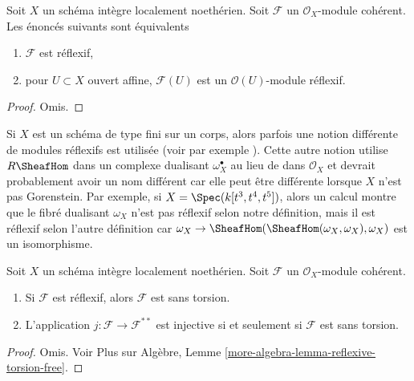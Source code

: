 \begin{lemma}
\label{lemma-check-reflexive-on-affines}
Soit  $X$  un schéma intègre localement noethérien. Soit  $\mathcal{F}$  un
 $\mathcal{O}_X$-module cohérent. Les énoncés suivants sont équivalents
\begin{enumerate}
\item $\mathcal{F}$  est réflexif,
\item pour  $U \subset X$  ouvert affine,  $\mathcal{F}(U)$  est un  $\mathcal{O}(U)$-module réflexif.
\end{enumerate}
\end{lemma}

\begin{proof}
Omis.
\end{proof}

\begin{remark}
\label{remark-different-reflexive}
Si  $X$  est un schéma de type fini sur un corps, alors parfois une notion
différente de modules réflexifs est utilisée (voir par exemple  \cite[bottom of page 5 and Definition 1.1.9]{HL}).
Cette autre notion utilise  $R\SheafHom$  dans un complexe dualisant  $\omega_X^\bullet$  au
lieu de dans  $\mathcal{O}_X$  et devrait probablement avoir un nom différent car elle
peut être différente lorsque  $X$  n'est pas Gorenstein. Par exemple, si
 $X = \Spec(k[t^3, t^4, t^5])$, alors un calcul montre que le fibré dualisant  $\omega_X$  n'est pas
réflexif selon notre définition, mais il est réflexif selon l'autre définition car
 $\omega_X \to \SheafHom(\SheafHom(\omega_X, \omega_X), \omega_X)$  est un isomorphisme.
\end{remark}

\begin{lemma}
\label{lemma-reflexive-torsion-free}
Soit  $X$  un schéma intègre localement noethérien. Soit  $\mathcal{F}$  un
 $\mathcal{O}_X$-module cohérent.
\begin{enumerate}
\item Si  $\mathcal{F}$  est réflexif, alors  $\mathcal{F}$  est sans torsion.
\item L'application  $j : \mathcal{F} \longrightarrow \mathcal{F}^{**}$  est injective si et seulement si  $\mathcal{F}$  est sans
torsion.
\end{enumerate}
\end{lemma}

\begin{proof}
Omis. Voir Plus sur Algèbre, Lemme  \ref{more-algebra-lemma-reflexive-torsion-free}.
\end{proof}

